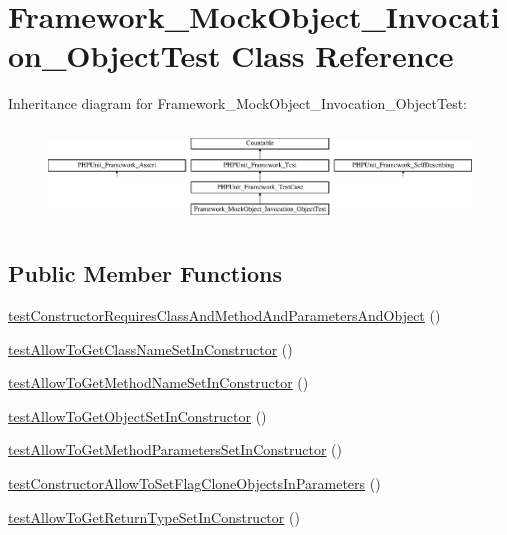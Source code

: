 \hypertarget{class_framework___mock_object___invocation___object_test}{}\section{Framework\+\_\+\+Mock\+Object\+\_\+\+Invocation\+\_\+\+Object\+Test Class Reference}
\label{class_framework___mock_object___invocation___object_test}
Inheritance diagram for Framework\+\_\+\+Mock\+Object\+\_\+\+Invocation\+\_\+\+Object\+Test\+:\begin{figure}[H]
\begin{center}
\leavevmode
\includegraphics[height=2.574713cm]{class_framework___mock_object___invocation___object_test}
\end{center}
\end{figure}
\subsection*{Public Member Functions}
\begin{DoxyCompactItemize}
\item 
\mbox{\hyperlink{class_framework___mock_object___invocation___object_test_a006a6d1aeed50e5554f505baeab543ec}{test\+Constructor\+Requires\+Class\+And\+Method\+And\+Parameters\+And\+Object}} ()
\item 
\mbox{\hyperlink{class_framework___mock_object___invocation___object_test_a6b53121d62958db6380429d23751e7b9}{test\+Allow\+To\+Get\+Class\+Name\+Set\+In\+Constructor}} ()
\item 
\mbox{\hyperlink{class_framework___mock_object___invocation___object_test_a10322e7e1e618ffa8635cccf6ff5e730}{test\+Allow\+To\+Get\+Method\+Name\+Set\+In\+Constructor}} ()
\item 
\mbox{\hyperlink{class_framework___mock_object___invocation___object_test_a12f67215f8f4b9794bd35018c233ca20}{test\+Allow\+To\+Get\+Object\+Set\+In\+Constructor}} ()
\item 
\mbox{\hyperlink{class_framework___mock_object___invocation___object_test_a71c90e01464d3f91cd7801f52071bd0a}{test\+Allow\+To\+Get\+Method\+Parameters\+Set\+In\+Constructor}} ()
\item 
\mbox{\hyperlink{class_framework___mock_object___invocation___object_test_ab14af6e75ae573bf07de8502847f7daa}{test\+Constructor\+Allow\+To\+Set\+Flag\+Clone\+Objects\+In\+Parameters}} ()
\item 
\mbox{\hyperlink{class_framework___mock_object___invocation___object_test_ac2bd1b51e0124b7ad3863d15c052b0f9}{test\+Allow\+To\+Get\+Return\+Type\+Set\+In\+Constructor}} ()
\end{DoxyCompactItemize}
